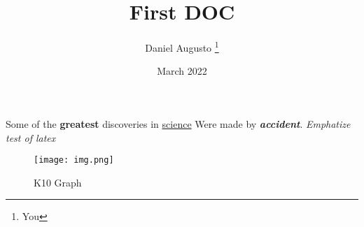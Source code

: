 \documentclass[12pt, letterpaper]{article}
\title{First DOC}
\author{Daniel Augusto \thanks{You}}
\date{March 2022}
\begin{document}
\maketitle
Some of the \textbf{greatest}
discoveries in \underline{science}
Were made by \textbf{\textit{accident}}.
\emph{Emphatize}
\textit{test of \emph{latex}}

\begin{figure}[h]
    \centering
    \texttt{[image: img.png]}
    \caption{K10 Graph}
    \label{fig:maker}
\end{figure}
\end{document}
